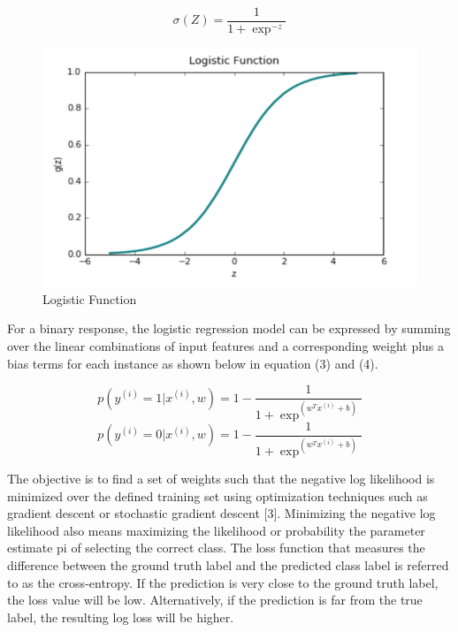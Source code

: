\documentclass{llncs}
\begin{document}
\begin{equation}
\sigma(Z) = \frac{1}{1+\exp^{-z}}
\end{equation}


\begin{figure}
\centering
\includegraphics[scale=1.0]{sigmoid.png}
\caption{Logistic Function}
\end{figure}

For a binary response, the logistic regression model can be expressed by summing over the linear combinations of input features and a corresponding weight plus a bias terms for each instance as shown below in equation (3) and (4).

\begin{equation}
p(y^{(i)} = 1 | x^{(i)},w) = 1-  \frac{1}{1+\exp^{(w^{T}x^{(i)}+b)}}
\end{equation}
\begin{equation}
p(y^{(i)} = 0 | x^{(i)},w) = 1-  \frac{1}{1+\exp^{(w^{T}x^{(i)}+b)}}
\end{equation}


The objective is to find a set of weights such that the negative log likelihood is minimized over the defined training set using optimization techniques such as gradient descent or stochastic gradient descent [3]. Minimizing the negative log likelihood also means maximizing the likelihood or probability the parameter estimate pi of selecting the correct class. The loss function that measures the difference between the ground truth label and the predicted class label is referred to as the cross-entropy. If the prediction is very close to the ground truth label, the loss value will be low. Alternatively, if the prediction is far from the true label, the resulting log loss will be higher.
\end{document}
